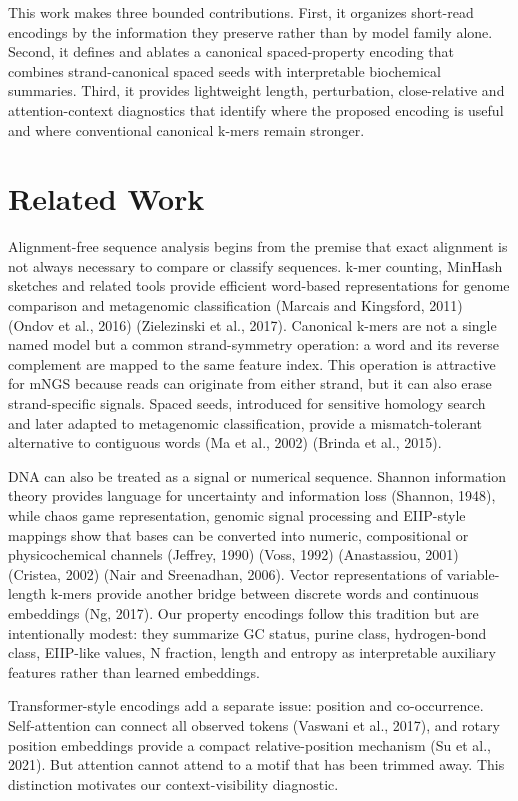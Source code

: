 \documentclass[11pt]{article}
\begin{document}
This work makes three bounded contributions. First, it organizes short-read encodings by the information they preserve rather than by model family alone. Second, it defines and ablates a canonical spaced-property encoding that combines strand-canonical spaced seeds with interpretable biochemical summaries. Third, it provides lightweight length, perturbation, close-relative and attention-context diagnostics that identify where the proposed encoding is useful and where conventional canonical k-mers remain stronger.


\section*{Related Work}

Alignment-free sequence analysis begins from the premise that exact alignment is not always necessary to compare or classify sequences. k-mer counting, MinHash sketches and related tools provide efficient word-based representations for genome comparison and metagenomic classification (Marcais and Kingsford, 2011) (Ondov et al., 2016) (Zielezinski et al., 2017). Canonical k-mers are not a single named model but a common strand-symmetry operation: a word and its reverse complement are mapped to the same feature index. This operation is attractive for mNGS because reads can originate from either strand, but it can also erase strand-specific signals. Spaced seeds, introduced for sensitive homology search and later adapted to metagenomic classification, provide a mismatch-tolerant alternative to contiguous words (Ma et al., 2002) (Brinda et al., 2015).


DNA can also be treated as a signal or numerical sequence. Shannon information theory provides language for uncertainty and information loss (Shannon, 1948), while chaos game representation, genomic signal processing and EIIP-style mappings show that bases can be converted into numeric, compositional or physicochemical channels (Jeffrey, 1990) (Voss, 1992) (Anastassiou, 2001) (Cristea, 2002) (Nair and Sreenadhan, 2006). Vector representations of variable-length k-mers provide another bridge between discrete words and continuous embeddings (Ng, 2017). Our property encodings follow this tradition but are intentionally modest: they summarize GC status, purine class, hydrogen-bond class, EIIP-like values, N fraction, length and entropy as interpretable auxiliary features rather than learned embeddings.


Transformer-style encodings add a separate issue: position and co-occurrence. Self-attention can connect all observed tokens (Vaswani et al., 2017), and rotary position embeddings provide a compact relative-position mechanism (Su et al., 2021). But attention cannot attend to a motif that has been trimmed away. This distinction motivates our context-visibility diagnostic.
\end{document}
